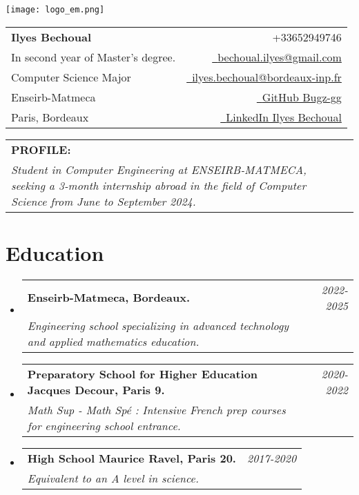 \documentclass[a4paper,11pt]{article}
\makeatletter
\newcommand{\resumeSubheading}[4]{
\vspace{0.5mm}\item
    \begin{tabular*}{0.98\textwidth}[t]{l@{\extracolsep{\fill}}r}
        \textbf{#1} & \textit{\footnotesize{#4}} \\
        \textit{\footnotesize{#3}} &  \footnotesize{#2}\\
    \end{tabular*}
    \vspace{-2.4mm}
}
\newcommand{\profilesection}[2]{%
  \vspace{0.5mm}
  \begin{tabular*}{0.98\textwidth}[t]{l@{\extracolsep{\fill}}r}
    \textbf{#1} & \vspace{1mm} \\  
    \parbox{\linewidth}{\textit{\footnotesize #2}}
  \end{tabular*}
  \vspace{-2.4mm}
}
\newcommand{\resumeSubHeadingListStart}{\begin{itemize}[leftmargin=*,labelsep=0mm]}
\newcommand{\resumeSubHeadingListEnd}{\end{itemize}\vspace{2mm}}
\newcommand{\name}{Ilyes Bechoual} %
\newcommand{\course}{Computer Science Major} %
\newcommand{\phone}{652949746} %
\newcommand{\emaila}{bechoual.ilyes@gmail.com} %
\newcommand{\emailb}{ilyes.bechoual@bordeaux-inp.fr} %
\newcommand{\po}{\texttt{[image: logo\_em.jpg]}}
\newcommand{\pj}{\texttt{[image: jacdecour.jpg]}}
\newcommand{\pr}{\texttt{[image: Ravel.jpg]}}
\makeatother
\begin{document}
\selectfont 


\parbox{2.5cm}{%
\texttt{[image: logo\_em.png]}
}
\parbox{\dimexpr\linewidth-2.8cm\relax}{
\begin{tabularx}{\linewidth}{L r} \\
  \textbf{\Large \name} & {\raisebox{0.0\height}{\footnotesize \faPhone}\ +33\phone}\\
  {In second year of Master's degree.} & \href{mailto:\emaila}{\raisebox{0.0\height}{\footnotesize \faEnvelope}\ {\emaila}} \\
  \course &  \href{mailto:\emailb}{\raisebox{0.0\height}{\footnotesize \faEnvelope}\ {\emailb}}\\
  {Enseirb-Matmeca} &  \href{https://github.com/Bugz-gg}{\raisebox{0.0\height}{\footnotesize \faGithub}\ {GitHub Bugz-gg}} \\
  {Paris, Bordeaux} & \href{https://www.linkedin.com/in/ilyes-bechoual/}{\raisebox{0.0\height}{\footnotesize \faLinkedin}\ {LinkedIn Ilyes Bechoual}}
\end{tabularx}
}



\vspace{4mm}
\profilesection{PROFILE:}{Student in Computer Engineering at ENSEIRB-MATMECA, seeking a 3-month internship abroad in the field of Computer Science from June to September 2024.}

%

\section{\textbf{Education}}
  \resumeSubHeadingListStart
  \resumeSubheading
      { Enseirb-Matmeca, Bordeaux. \hspace{9.7cm}\raisebox{-0.3\height}{\po}}{}
      {Engineering school specializing in advanced technology and applied mathematics education.}{2022-2025}
    \resumeSubheading
      { Preparatory School for Higher Education Jacques Decour, Paris 9. \hspace{3.6cm}\raisebox{-0.3\height}{\pj}}{}
      {Math Sup - Math Spé : Intensive French prep courses for engineering school entrance.}{2020-2022}
    \resumeSubheading
      { High School Maurice Ravel, Paris 20. \hspace{8.3cm}\raisebox{-0.3\height}{\pr}}{}
      {Equivalent to an A level in science.}{2017-2020}
  \resumeSubHeadingListEnd
\vspace{-5.5mm}
%
\end{document}
